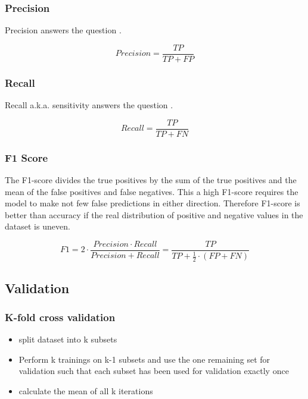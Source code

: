 \subsubsection*{Precision}

Precision answers the question .

$$
    Precision = \frac{TP}{TP + FP}
$$

\subsubsection*{Recall}

Recall a.k.a. sensitivity answers the question .

$$
    Recall = \frac{TP}{TP + FN}
$$

\subsubsection*{F1 Score}

The F1-score divides the true positives by the sum of the true positives and the mean of the false positives and false negatives. This a high F1-score requires the model to make not few false predictions in either direction. Therefore F1-score is better than accuracy if the real distribution of positive and negative values in the dataset is uneven.

$$
    F1 = 2 \cdot \frac{Precision \cdot Recall}{Precision + Recall} = \frac{TP}{TP + \frac{1}{2} \cdot (FP + FN)}
$$


\subsection*{Validation}

\subsubsection{K-fold cross validation}

\begin{itemize}
    \item split dataset into k subsets
    \item Perform k trainings on k-1 subsets and use the one remaining set for validation such that each subset has been used for validation exactly once
    \item calculate the mean of all k iterations
\end{itemize}

